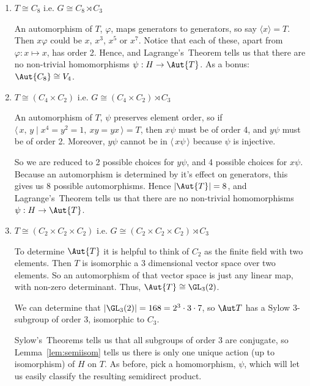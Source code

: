 \begin{enumerate}
    \item \(T \cong C_8\) i.e. \(G \cong C_8 \rtimes C_3\)

        An automorphism of \(T\), \(\varphi\), maps generators to generators, so say \(\langle x \rangle = T\).
        Then \(x\varphi\) could be \(x\), \(x^3\), \(x^5\) or \(x^7\).
        Notice that each of these, apart from \(\varphi:x \mapsto x\), has order 2.
        Hence, and Lagrange's~Theorem tells us that there are no non-trivial homomorphisms \(\psi:H \to \Aut{T}\).
        As a bonus: \(\Aut{C_8} \cong V_4\).

    \item \(T \cong (C_4 \times C_2)\) i.e. \(G \cong (C_4 \times C_2) \rtimes C_3\)

        An automorphism of \(T\), \(\psi\) preserves element order, so if \(\langle\,x,\,y \mid x^4 = y^2 = 1,\ xy =
        yx\,\rangle = T\), then \(x\psi\) must be of order 4, and \(y\psi\) must be of order 2.
        Moreover, \(y\psi\) cannot be in \(\langle\,x\psi\,\rangle\) because \(\psi\) is injective.

        So we are reduced to 2 possible choices for \(y\psi\), and 4 possible choices for \(x\psi\).
        Because an automorphism is determined by it's effect on generators, this gives us 8 possible automorphisms.
        Hence \(|\Aut{T}| = 8\), and Lagrange's~Theorem tells us that there are no non-trivial homomorphisms \(\psi:H
        \to \Aut{T}\).

    \item \(T \cong (C_2 \times C_2 \times C_2)\) i.e. \(G \cong (C_2 \times C_2 \times C_2) \rtimes C_3\)

        To determine \(\Aut{T}\) it is helpful to think of \(C_2\) as the finite field with two elements.
        Then \(T\) is isomorphic a 3 dimensional vector space over two elements.
        So an automorphism of that vector space is just any linear map, with non-zero determinant.
        Thus, \(\Aut{T} \cong \GL_3(2)\).

        We can determine that \(|\GL_3(2)| = 168 = 2^3 \cdot 3 \cdot 7\), so \(\Aut T\) has a Sylow 3-subgroup of order
        3, isomorphic to \(C_3\).

        Sylow's~Theorems tells us that all subgroups of order 3 are conjugate, so Lemma~\ref{lem:semiisom} tells us
        there is only one unique action (up to isomorphism) of \(H\) on \(T\).
        As before, pick a homomorphism, \(\psi\), which will let us easily classify the resulting semidirect product.


\end{enumerate}
